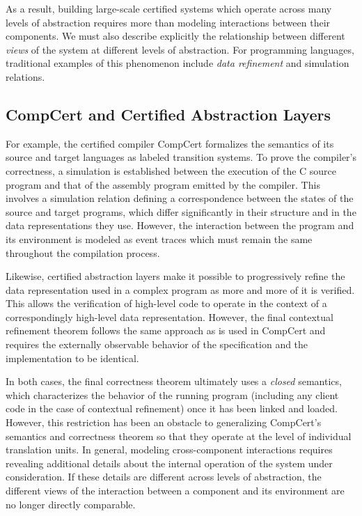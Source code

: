 \documentclass[acmsmall,review,anonymous]{acmart}\settopmatter{printfolios=true,printccs=false,printacmref=false}
\begin{document}
As a result,
building large-scale certified systems
which operate across many levels of abstraction
requires more than
modeling interactions between their components.
We must also describe explicitly
the relationship between
different \emph{views} of the system
at different levels of abstraction.
For programming languages,
traditional examples of this phenomenon include
\emph{data refinement} \cite{dataref}
and simulation relations.

\subsection{CompCert and Certified Abstraction Layers}

For example,
the certified compiler CompCert \cite{compcert}
formalizes the semantics of its source and target languages
as labeled transition systems.
To prove the compiler's correctness,
a simulation is established between
the execution of the C source program
and that of the assembly program
emitted by the compiler.
This involves a simulation relation
defining a correspondence between
the states of the source and target programs,
which differ significantly in their structure
and in the data representations they use.
However,
the interaction between the program and its environment
is modeled as event traces which must remain the same
throughout the compilation process.

Likewise,
certified abstraction layers \cite{popl15}
make it possible to progressively refine
the data representation used in a complex program
as more and more of it is verified.
This allows the verification of high-level code
to operate in the context of a correspondingly
high-level data representation.
However, the final contextual refinement theorem
follows the same approach as is used in CompCert
and requires the externally observable behavior of
the specification and the implementation
to be identical.

In both cases,
the final correctness theorem
ultimately uses a \emph{closed} semantics,
which characterizes the behavior of the running program
(including any client code in the case of contextual refinement)
once it has been linked and loaded.
However,
this restriction has been an obstacle
to generalizing CompCert's
semantics and correctness theorem
so that they operate at the level of individual translation units.
In general, modeling cross-component interactions
requires revealing additional details about
the internal operation of the system under consideration.
If these details are different
across levels of abstraction,
the different views of the interaction
between a component and its environment
are no longer directly comparable.
\end{document}
